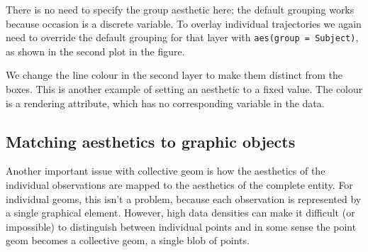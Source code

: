 \noindent There is no need to specify the group aesthetic here; the default grouping works because occasion is a discrete variable.  To overlay individual trajectories we again need to override the default grouping for that layer with {\tt aes(group = Subject)}, as shown in the second plot in the figure.

% 


We change the line colour in the second layer to make them distinct from the boxes.  This is another example of setting an aesthetic to a fixed value.  The colour is a rendering attribute, which has no corresponding variable in the data.

% 



% 

\subsection{Matching aesthetics to graphic objects}
\label{sub:matching}

Another important issue with collective geom is how the aesthetics of the individual observations are mapped to the aesthetics of the complete entity.  For individual geoms, this isn't a problem, because each observation is represented by a single graphical element.  However, high data densities can make it difficult (or impossible) to distinguish between individual points and in some sense the point geom becomes a collective geom, a single blob of points.

